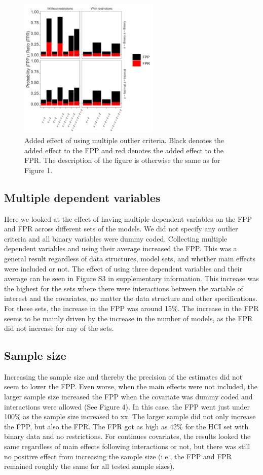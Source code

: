 \begin{figure}[t]
\includegraphics[width=0.6\textwidth]{R/Analysis/Result/Figures/Figure1B.jpeg}
\centering
\caption{Added effect of using multiple outlier criteria. Black denotes the added effect to the FPP and red denotes the added effect to the FPR.  The description of the figure is otherwise the same as for Figure 1.}
\label{fig:mainfigure}
\end{figure}

\subsection{Multiple dependent variables}
Here we looked at the effect of having multiple dependent variables on the FPP and FPR across different sets of the models. We did not specify any outlier criteria and all binary variables were dummy coded. Collecting multiple dependent variables and using their average increased the FPP. This was a general result regardless of data structures, model sets, and whether main effects were included or not. The effect of using three dependent variables and their average can be seen in Figure S3 in supplementary information. This increase was the highest for the sets where there were interactions between the variable of interest and the covariates, no matter the data structure and other specifications. For these sets, the increase in the FPP was around 15\%. The increase in the FPR seems to be mainly driven by the increase in the number of models, as the FPR did not increase for any of the sets. 

\subsection{Sample size}
Increasing the sample size and thereby the precision of the estimates did not seem to lower the FPP. Even worse, when the main effects were not included, the larger sample size increased the FPP when the covariate was dummy coded and interactions were allowed (See Figure 4). In this case, the FPP went just under 100\% as the sample size increased to xx. The larger sample did not only increase the FPP, but also the FPR. The FPR got as high as 42\% for the HCI set with binary data and no restrictions. For continues covariates, the results looked the same regardless of main effects following interactions or not, but there was still no positive effect from increasing the sample size (i.e., the FPP and FPR remained roughly the same for all tested sample sizes). 


